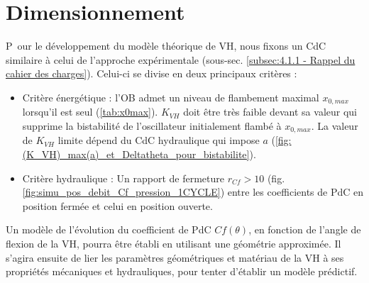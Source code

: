 \section{Dimensionnement}
\label{sec:5.3 - Dimensionnement et conception}
\lettrine[lines=1]{P~}{}our le développement du modèle théorique de VH, nous fixons un CdC similaire à celui de l'approche expérimentale (sous-sec. \ref{subsec:4.1.1 - Rappel du cahier des charges}). Celui-ci se divise en deux principaux critères :
\begin{itemize}[label=$\blacksquare$]
	\item Critère énergétique : l'OB admet un niveau de flambement maximal $x_{0,max}$ lorsqu'il est seul (\ref{tab:x0max}). $K_{VH}$ doit être très faible devant sa valeur qui supprime la bistabilité de l'oscillateur initialement flambé à $x_{0,max}$. La valeur de $K_{VH}$ limite dépend du CdC hydraulique qui impose $a$ (\ref{fig:(K_VH)_max(a)_et_Deltatheta_pour_bistabilite}).
	\item Critère hydraulique : Un rapport de fermeture $r_{Cf}>10$ (fig. \ref{fig:simu_pos_debit_Cf_pression_1CYCLE}) entre les coefficients de PdC en position fermée et celui en position ouverte.
\end{itemize}

Un modèle de l'évolution du coefficient de PdC $Cf(\theta)$, en fonction de l'angle de flexion de la VH, pourra être établi en utilisant une géométrie approximée. Il s'agira ensuite de lier les paramètres géométriques et matériau de la VH à ses propriétés mécaniques et hydrauliques, pour tenter d'établir un modèle prédictif. 
